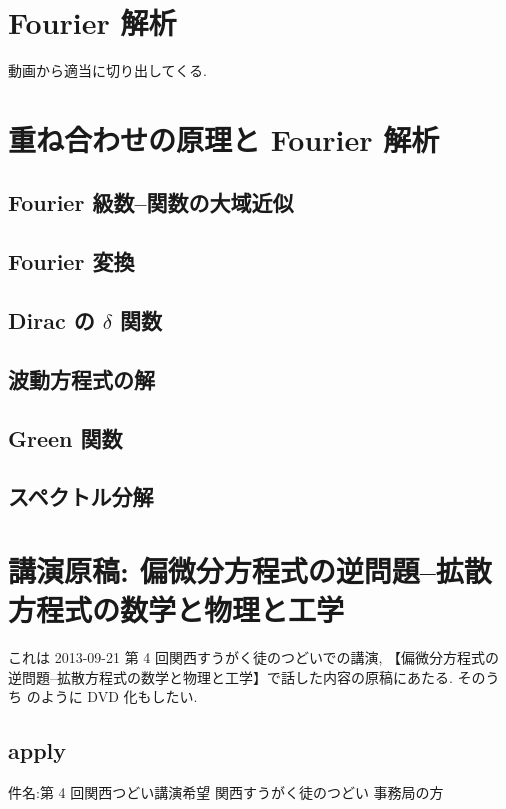 \documentclass[openany, a4paper, oneside]{jsbook}
\theoremstyle{break}
\theoremstyle{breakdefn}
\begin{document}
\chapter{Fourier 解析}


動画から適当に切り出してくる.
\chapter{重ね合わせの原理と Fourier 解析}

\section{Fourier 級数--関数の大域近似}

\section{Fourier 変換}

\section{Dirac の $\delta$ 関数}

\section{波動方程式の解}

\section{Green 関数}

\section{スペクトル分解}

\chapter{講演原稿: 偏微分方程式の逆問題--拡散方程式の数学と物理と工学}


これは 2013-09-21 第 4 回関西すうがく徒のつどいでの講演,
【偏微分方程式の逆問題--拡散方程式の数学と物理と工学】で話した内容の原稿にあたる.
そのうち \cite{phasetr1} のように DVD 化もしたい.
\section{apply}


件名:第 4 回関西つどい講演希望
関西すうがく徒のつどい 事務局の方
\end{document}
